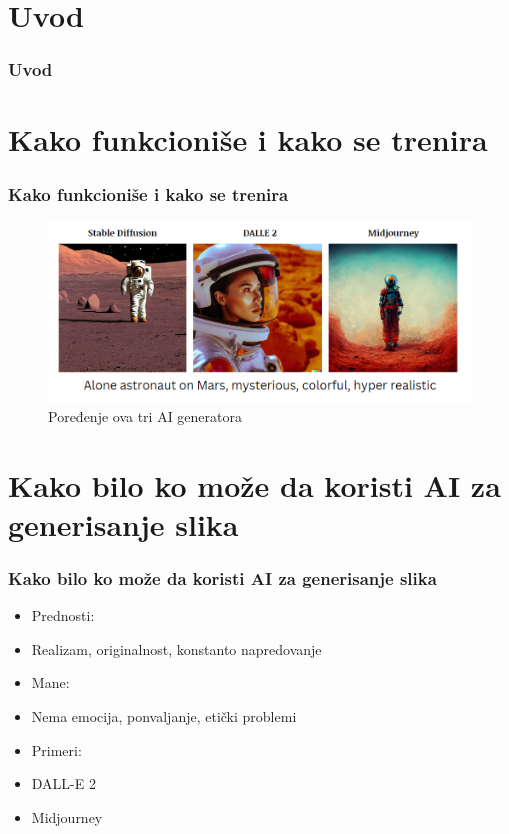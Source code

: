 \documentclass{beamer}
\begin{document}
\section{Uvod} %

\begin{frame}[fragile]\frametitle{Uvod}
	
\end{frame}

\section{Kako funkcioniše i kako se trenira}

\begin{frame}[fragile]\frametitle{Kako funkcioniše i kako se trenira}
	
\begin{figure}[htp]
\centering
\includegraphics[width=1\textwidth]{astronaut.png}
\caption{Poređenje ova tri AI generatora}
\label{fig: Astronaut}
\end{figure}
	
\end{frame}

\section{Kako bilo ko može da koristi AI za generisanje slika}	%

\begin{frame}[fragile]\frametitle{Kako bilo ko može da koristi AI za generisanje slika}
    \begin{itemize}
		\item Prednosti:
        \item[] Realizam, originalnost, konstanto napredovanje
        \item Mane:
        \item[] Nema emocija, ponvaljanje, etički problemi
        \item Primeri:
		\item[] DALL-E 2
		\item[] Midjourney
	\end{itemize}
	
\end{frame}
\end{document}
